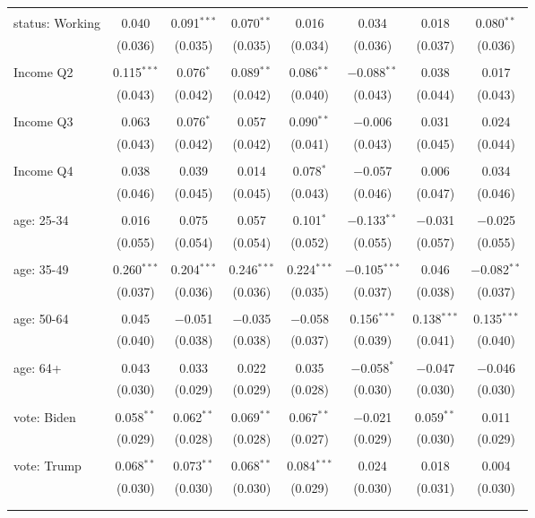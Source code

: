 \begin{tabular}{@{\extracolsep{5pt}}lccccccc}
  & & & & & & & \\ 
 status: Working & 0.040 & 0.091$^{***}$ & 0.070$^{**}$ & 0.016 & 0.034 & 0.018 & 0.080$^{**}$ \\ 
  & (0.036) & (0.035) & (0.035) & (0.034) & (0.036) & (0.037) & (0.036) \\ 
  & & & & & & & \\ 
 Income Q2 & 0.115$^{***}$ & 0.076$^{*}$ & 0.089$^{**}$ & 0.086$^{**}$ & $-$0.088$^{**}$ & 0.038 & 0.017 \\ 
  & (0.043) & (0.042) & (0.042) & (0.040) & (0.043) & (0.044) & (0.043) \\ 
  & & & & & & & \\ 
 Income Q3 & 0.063 & 0.076$^{*}$ & 0.057 & 0.090$^{**}$ & $-$0.006 & 0.031 & 0.024 \\ 
  & (0.043) & (0.042) & (0.042) & (0.041) & (0.043) & (0.045) & (0.044) \\ 
  & & & & & & & \\ 
 Income Q4 & 0.038 & 0.039 & 0.014 & 0.078$^{*}$ & $-$0.057 & 0.006 & 0.034 \\ 
  & (0.046) & (0.045) & (0.045) & (0.043) & (0.046) & (0.047) & (0.046) \\ 
  & & & & & & & \\ 
 age: 25-34 & 0.016 & 0.075 & 0.057 & 0.101$^{*}$ & $-$0.133$^{**}$ & $-$0.031 & $-$0.025 \\ 
  & (0.055) & (0.054) & (0.054) & (0.052) & (0.055) & (0.057) & (0.055) \\ 
  & & & & & & & \\ 
 age: 35-49 & 0.260$^{***}$ & 0.204$^{***}$ & 0.246$^{***}$ & 0.224$^{***}$ & $-$0.105$^{***}$ & 0.046 & $-$0.082$^{**}$ \\ 
  & (0.037) & (0.036) & (0.036) & (0.035) & (0.037) & (0.038) & (0.037) \\ 
  & & & & & & & \\ 
 age: 50-64 & 0.045 & $-$0.051 & $-$0.035 & $-$0.058 & 0.156$^{***}$ & 0.138$^{***}$ & 0.135$^{***}$ \\ 
  & (0.040) & (0.038) & (0.038) & (0.037) & (0.039) & (0.041) & (0.040) \\ 
  & & & & & & & \\ 
 age: 64+ & 0.043 & 0.033 & 0.022 & 0.035 & $-$0.058$^{*}$ & $-$0.047 & $-$0.046 \\ 
  & (0.030) & (0.029) & (0.029) & (0.028) & (0.030) & (0.030) & (0.030) \\ 
  & & & & & & & \\ 
 vote: Biden & 0.058$^{**}$ & 0.062$^{**}$ & 0.069$^{**}$ & 0.067$^{**}$ & $-$0.021 & 0.059$^{**}$ & 0.011 \\ 
  & (0.029) & (0.028) & (0.028) & (0.027) & (0.029) & (0.030) & (0.029) \\ 
  & & & & & & & \\ 
 vote: Trump & 0.068$^{**}$ & 0.073$^{**}$ & 0.068$^{**}$ & 0.084$^{***}$ & 0.024 & 0.018 & 0.004 \\ 
  & (0.030) & (0.030) & (0.030) & (0.029) & (0.030) & (0.031) & (0.030) \\ 
  & & & & & & & \\ 
\hline \\[-1.8ex] 


\end{tabular}
